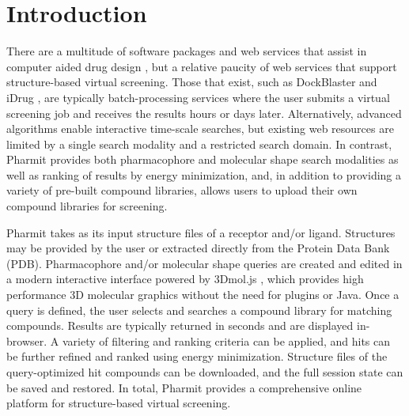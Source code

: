 \section{Introduction}

There are a multitude of software packages and web services that assist in computer aided drug design \cite{Villoutreix_2013}, but a relative paucity of web services that support structure-based virtual screening.  Those that exist, such as DockBlaster \cite{Irwin_2009} and iDrug \cite{Wang_2014}, are typically batch-processing services where the user submits a virtual screening job and receives the results hours or days later.  Alternatively, advanced algorithms enable interactive time-scale searches, but existing web resources \cite{Koes_2012,Koes_2012z} are limited by a single search modality and a restricted search domain.  In contrast, Pharmit provides both pharmacophore and molecular shape search modalities as well as ranking of results by energy minimization, and, in addition to providing a variety of pre-built compound libraries, allows users to upload their own compound libraries for screening. 

Pharmit takes as its input structure files of a receptor and/or ligand. Structures may be provided by the user or extracted directly from the Protein Data Bank (PDB). 
Pharmacophore and/or molecular shape queries are created and edited in a modern interactive interface powered by 3Dmol.js \cite{Rego_2014}, which provides high performance 3D molecular graphics without the need for plugins or Java. Once a query is defined, the user selects and searches a compound library for matching compounds.  Results are typically returned in seconds and are displayed in-browser.  A variety of filtering and ranking criteria can be applied, and hits can be further refined and ranked using energy minimization. Structure files of the query-optimized hit compounds can be downloaded, and the full session state can be saved and restored.  In total, Pharmit provides a comprehensive online platform for structure-based virtual screening.





